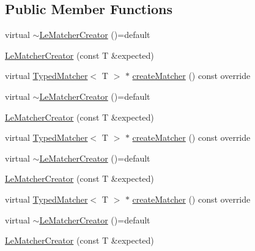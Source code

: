 \subsection*{Public Member Functions}
\begin{DoxyCompactItemize}
\item 
virtual \mbox{\hyperlink{structfakeit_1_1internal_1_1LeMatcherCreator_ac886c9e22851607c9464000a64fa5654}{$\sim$\+Le\+Matcher\+Creator}} ()=default
\item 
\mbox{\hyperlink{structfakeit_1_1internal_1_1LeMatcherCreator_a58c849c7f94f5a3fd319b267173cee2b}{Le\+Matcher\+Creator}} (const T \&expected)
\item 
virtual \mbox{\hyperlink{structfakeit_1_1TypedMatcher}{Typed\+Matcher}}$<$ T $>$ $\ast$ \mbox{\hyperlink{structfakeit_1_1internal_1_1LeMatcherCreator_a413d0c534701c79a96648111a337f270}{create\+Matcher}} () const override
\item 
virtual \mbox{\hyperlink{structfakeit_1_1internal_1_1LeMatcherCreator_ac886c9e22851607c9464000a64fa5654}{$\sim$\+Le\+Matcher\+Creator}} ()=default
\item 
\mbox{\hyperlink{structfakeit_1_1internal_1_1LeMatcherCreator_a58c849c7f94f5a3fd319b267173cee2b}{Le\+Matcher\+Creator}} (const T \&expected)
\item 
virtual \mbox{\hyperlink{structfakeit_1_1TypedMatcher}{Typed\+Matcher}}$<$ T $>$ $\ast$ \mbox{\hyperlink{structfakeit_1_1internal_1_1LeMatcherCreator_a413d0c534701c79a96648111a337f270}{create\+Matcher}} () const override
\item 
virtual \mbox{\hyperlink{structfakeit_1_1internal_1_1LeMatcherCreator_ac886c9e22851607c9464000a64fa5654}{$\sim$\+Le\+Matcher\+Creator}} ()=default
\item 
\mbox{\hyperlink{structfakeit_1_1internal_1_1LeMatcherCreator_a58c849c7f94f5a3fd319b267173cee2b}{Le\+Matcher\+Creator}} (const T \&expected)
\item 
virtual \mbox{\hyperlink{structfakeit_1_1TypedMatcher}{Typed\+Matcher}}$<$ T $>$ $\ast$ \mbox{\hyperlink{structfakeit_1_1internal_1_1LeMatcherCreator_a413d0c534701c79a96648111a337f270}{create\+Matcher}} () const override
\item 
virtual \mbox{\hyperlink{structfakeit_1_1internal_1_1LeMatcherCreator_ac886c9e22851607c9464000a64fa5654}{$\sim$\+Le\+Matcher\+Creator}} ()=default
\item 
\mbox{\hyperlink{structfakeit_1_1internal_1_1LeMatcherCreator_a58c849c7f94f5a3fd319b267173cee2b}{Le\+Matcher\+Creator}} (const T \&expected)
\item 

\end{DoxyCompactItemize}
